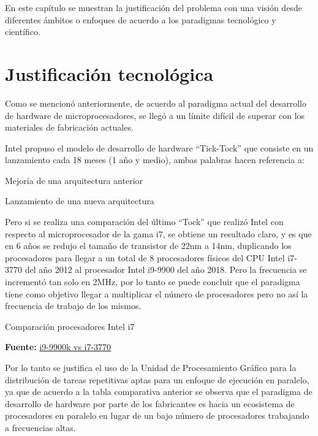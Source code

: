 \documentclass[../main/main.tex]{subfiles}
\begin{document}
\espacio

  En este capítulo se muestran la justificación del problema con una visión desde diferentes ámbitos o enfoques de acuerdo a los paradigmas tecnológico y científico.

  \section{Justificación tecnológica}

  Como se mencionó anteriormente, de acuerdo al paradigma actual del desarrollo de hardware de microprocesadores, se llegó a un límite difícil de superar con los materiales de fabricación actuales.

  Intel propuso el modelo de desarrollo de hardware ``Tick-Tock'' que consiste en un lanzamiento cada 18 meses (1 año y medio), ambas palabras hacen referencia a:

  \begin{description}[align=left]
    \item[Tick:] Mejoría de una arquitectura anterior
    \item[Tock:] Lanzamiento de una nueva arquitectura
  \end{description}

  Pero si se realiza una comparación del último ``Tock'' que realizó Intel con respecto al microprocesador de la gama i7, se obtiene un resultado claro, y es que en 6 años se redujo el tamaño de transistor de 22nm a 14nm, duplicando los procesadores para llegar a un total de 8 procesadores físicos del CPU Intel i7-3770 del año 2012 al procesador Intel i9-9900 del año 2018. Pero la frecuencia se incrementó tan solo en 2MHz, por lo tanto se puede concluir que el paradigma tiene como objetivo llegar a multiplicar el número de procesadores pero no así la frecuencia de trabajo de los mismos.

  \begin{table}[H]
    \centering
    \caption{Comparación procesadores Intel i7}
    
    \caption*{\textbf{Fuente:} \href{https://cpu.userbenchmark.com/Compare/Intel-Core-i9-9900K-vs-Intel-Core-i7-3770/4028vs1979}{i9-9900k vs i7-3770\cite{web:i9_vs_i7}}}
  \end{table}

  Por lo tanto se justifica el uso de la Unidad de Procesamiento Gráfico para la distribución de tareas repetitivas aptas para un enfoque de ejecución en paralelo, ya que de acuerdo a la tabla comparativa anterior se observa que el paradigma de desarrollo de hardware por parte de los fabricantes es hacia un ecosistema de procesadores en paralelo en lugar de un bajo número de procesadores trabajando a frecuencias altas.
\end{document}
